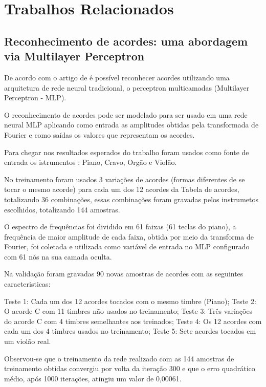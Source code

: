 \chapter{Trabalhos Relacionados}
\label{cap:trabalhos:relacionados}


\section{Reconhecimento de acordes: uma abordagem via Multilayer Perceptron}
\label{cap:trabalhos:sec:relacionados:uso:citacoes}


De acordo com o artigo de \cite{cletoa2010reconhecimento} é possível reconhecer acordes utilizando uma arquitetura de rede neural tradicional, o perceptron multicamadas (Multilayer Perceptron - MLP).  

O reconhecimento de acordes pode ser modelado para ser usado em uma rede neural MLP aplicando como entrada as amplitudes obtidas pela transformada de Fourier e como saídas os valores que representam os acordes.  

Para chegar nos resultados esperados do trabalho foram usados como fonte de entrada os istrumentos : Piano, Cravo, Orgão e Violão. 

No treinamento foram usados 3 variações de acordes (formas diferentes de se tocar o mesmo acorde) para cada um dos 12 acordes da Tabela de acordes, totalizando 36 combinações, essas combinações foram gravadas pelos instrumetos escolhidos, totalizando 144 amostras.

O espectro de frequências foi dividido em 61 faixas (61 teclas do piano), a frequência de maior amplitude de cada faixa, obtida por meio da transforma de Fourier, foi coletada e utilizada como variável de entrada no MLP configurado com 61 nós na sua camada oculta.

Na validação foram gravadas 90 novas amostras de acordes com as seguintes caracteristicas: 

    Teste 1: Cada um dos 12 acordes tocados com o mesmo timbre (Piano);
    Teste 2: O acorde C com 11 timbres não usados no treinamento;
    Teste 3: Três variações do acorde C com 4 timbres semelhantes aos treinados;
    Teste 4: Os 12 acordes com cada um dos 4 timbres usados no treinamento;
    Teste 5: Sete acordes tocados em um violão real.

Observou-se que o treinamento da rede realizado com as 144 amostras de treinamento obtidas convergiu por volta da iteração 300 e que o erro quadrático médio, após 1000 iterações, atingiu um valor de 0,00061.

